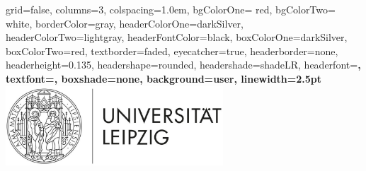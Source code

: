 \documentclass[portrate,a0paper,fontscale=0.4,margin=1cm]{baposter}
\begin{document}
\begin{poster}%
  {
  grid=false, %
  columns=3,
  colspacing=1.0em,
  bgColorOne= red, %
  bgColorTwo= white, %
  borderColor=gray, %
  headerColorOne=darkSilver, %
  headerColorTwo=lightgray, 
  headerFontColor=black, %
  boxColorOne=darkSilver, %
  boxColorTwo=red, %
  textborder=faded,
  eyecatcher=true,
  headerborder=none, %
  headerheight=0.135\textheight,
  headershape=rounded, %
  headershade=shadeLR,
  headerfont=\LARGE\bf,  %
  textfont={\color{black}\setlength{\parindent}{1.5em}},
  boxshade=none, %
  background=user, %
  linewidth=2.5pt
  }
  {
      \includegraphics[height=8.0em]{uni_leipzig-logo.jpg}\\
      
}
\end{poster}
\end{document}
